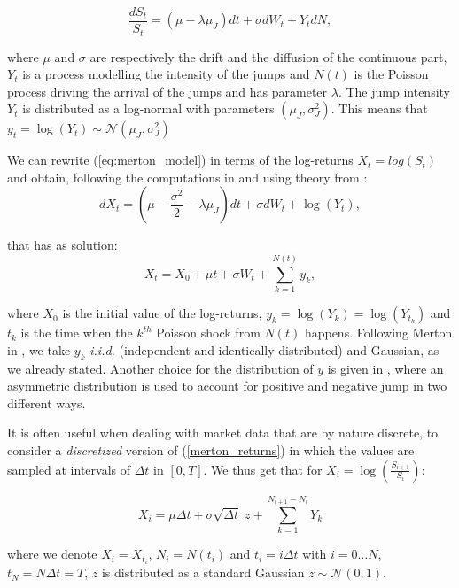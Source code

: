 \begin{equation}
\label{eq:merton_model}
\frac{dS_t}{S_t} = (\mu - \lambda \mu_J) dt + \sigma dW_t  + Y_t dN,
\end{equation}

where $\mu$ and $\sigma$ are respectively the drift and the diffusion of the continuous part, $Y_t$ is a process modelling the intensity of the jumps and $N(t)$ is the Poisson process driving the arrival of the jumps and has parameter $\lambda$.
The jump intensity $Y_t$ is distributed as a log-normal with parameters $(\mu_J, \sigma_J^2)$. This means that $ y_t = \log(Y_t) \sim \mathcal{N}(\mu_J, \sigma_J^2)$

We can rewrite (\ref{eq:merton_model}) in terms of the log-returns $X_t = log(S_t)$ and obtain, following the computations in \cite{MARTIN2007} and using theory from \cite{TANKOV2015}:
\begin{equation}
dX_t = (\mu - \frac{\sigma^2}{2} - \lambda \mu_J)dt + \sigma dW_t + \log(Y_t),
\end{equation}

that has as solution:
\begin{equation}
\label{merton_returns}
X_t =X_0 +  \mu t + \sigma W_t + \sum_{k=1}^{N(t)} y_k,
\end{equation}

where $X_0$ is the initial value of the log-returns, $y_k= \log(Y_k) = \log(Y_{t_k})$ and $t_k$ is the time when the $k^{th}$ Poisson shock from $N(t)$ happens. 
Following Merton in \cite{MERTON1976}, we take $y_k$ \textit{i.i.d.} (independent and identically distributed) and Gaussian, as we already stated.
Another choice for the distribution of $y$ is given in \cite{KOU2002}, where an asymmetric distribution is used to account for positive and negative jump in two different ways. 


It is often useful when dealing with market data that are by nature discrete, to consider a \textit{discretized} version of (\ref{merton_returns}) in which the values are sampled at intervals of $\Delta t$ in $[0, T]$. We thus get that for $X_i = \log(\frac{S_{i+1}}{S_i})$:

\begin{equation}
\label{discrete_returns}
X_i =  \mu \Delta t + \sigma \sqrt{\Delta t} \; z +  \sum_{k=1}^{N_{i+1} - N_i} Y_k
\end{equation}

where we denote $X_i = X_{t_i}$, $N_i = N(t_i)$ and $t_i = i \Delta t$ with $i= 0 \dots N$, $t_N = N \Delta t= T$,  $z$ is distributed as a standard Gaussian $ z\sim \mathcal{N}(0,1)$.

